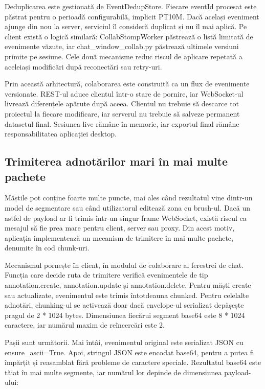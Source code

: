 Deduplicarea este gestionată de EventDedupStore. Fiecare eventId procesat este păstrat pentru o perioadă configurabilă, implicit PT10M. Dacă același eveniment ajunge din nou la server, serviciul îl consideră duplicat și nu îl mai aplică. Pe client există o logică similară: CollabStompWorker păstrează o listă limitată de evenimente văzute, iar chat\_window\_collab.py păstrează ultimele versiuni primite pe sesiune. Cele două mecanisme reduc riscul de aplicare repetată a aceleiași modificări după reconectări sau retry-uri.

Prin această arhitectură, colaborarea este construită ca un flux de evenimente versionate. REST-ul aduce clientul într-o stare de pornire, iar WebSocket-ul livrează diferențele apărute după aceea. Clientul nu trebuie să descarce tot proiectul la fiecare modificare, iar serverul nu trebuie să salveze permanent datasetul final. Sesiunea live rămâne în memorie, iar exportul final rămâne responsabilitatea aplicației desktop.

\subsection{Trimiterea adnotărilor mari în mai multe pachete}

Măștile pot conține foarte multe puncte, mai ales când rezultatul vine dintr-un model de segmentare sau când utilizatorul editează zona cu brush-ul. Dacă un astfel de payload ar fi trimis într-un singur frame WebSocket, există riscul ca mesajul să fie prea mare pentru client, server sau proxy. Din acest motiv, aplicația implementează un mecanism de trimitere în mai multe pachete, denumite în cod chunk-uri.

Mecanismul pornește în client, în modulul de colaborare al ferestrei de chat. Funcția care decide ruta de trimitere verifică evenimentele de tip annotation.create, annotation.update și annotation.delete. Pentru măști create sau actualizate, evenimentul este trimis întotdeauna chunked. Pentru celelalte adnotări, chunking-ul se activează doar dacă envelope-ul serializat depășește pragul de 2 * 1024 bytes. Dimensiunea fiecărui segment base64 este 8 * 1024 caractere, iar numărul maxim de reîncercări este 2.

Pașii sunt următorii. Mai întâi, evenimentul original este serializat JSON cu ensure\_ascii=True. Apoi, stringul JSON este encodat base64, pentru a putea fi împărțit și reasamblat fără probleme de caractere speciale. Rezultatul base64 este tăiat în mai multe segmente, iar numărul lor depinde de dimensiunea payload-ului:

